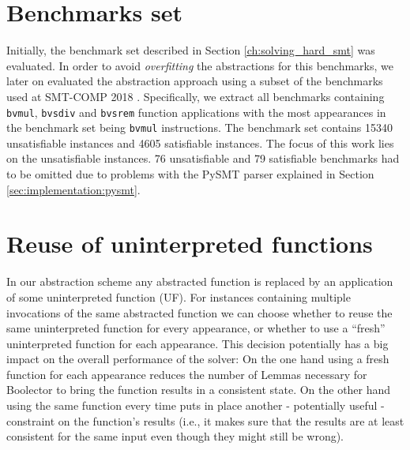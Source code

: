 \section{Benchmarks set}
Initially, the benchmark set described in Section \ref{ch:solving_hard_smt} was evaluated.
In order to avoid \textit{overfitting} the abstractions for this benchmarks, we later on
evaluated the abstraction approach using a subset of the benchmarks used at SMT-COMP 2018 \cite{SMTCOMP18}.
Specifically, we extract all benchmarks containing \texttt{bvmul}, \texttt{bvsdiv} and \texttt{bvsrem} function applications with the most appearances in the benchmark set being \texttt{bvmul} instructions.
The benchmark set contains 15340 unsatisfiable instances and 4605 satisfiable instances. The focus of this work lies on the unsatisfiable instances.
76 unsatisfiable and 79 satisfiable benchmarks had to be omitted due to problems with the PySMT parser explained in Section \ref{sec:implementation:pysmt}.

\section{Reuse of uninterpreted functions}
In our abstraction scheme any abstracted function is replaced by an application of some uninterpreted function (UF).
For instances containing multiple invocations of the same abstracted function we can choose whether to reuse the same uninterpreted function for every appearance,
or whether to use a \enquote{fresh} uninterpreted function for each appearance.
This decision potentially has a big impact on the overall performance of the solver:
On the one hand using a fresh function for each appearance reduces the number of Lemmas necessary for Boolector to bring the function results in a consistent state.
On the other hand using the same function every time puts in place another - potentially useful - constraint on the function's results
(i.e., it makes sure that the results are at least consistent for the same input even though they might still be wrong).


